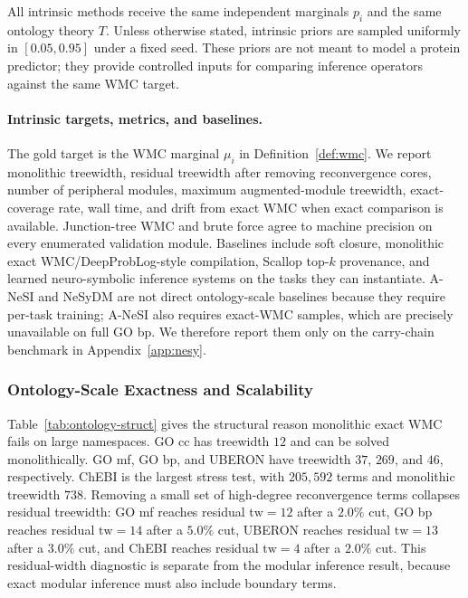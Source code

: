 \documentclass[letterpaper]{article}
\newcommand{\tw}{\ensuremath{\mathrm{tw}}}
\begin{document}
All intrinsic methods receive the same independent marginals $p_i$ and the same ontology theory $T$. Unless otherwise stated, intrinsic priors are sampled uniformly in $[0.05,0.95]$ under a fixed seed. These priors are not meant to model a protein predictor; they provide controlled inputs for comparing inference operators against the same WMC target.

\paragraph{Intrinsic targets, metrics, and baselines.}
The gold target is the WMC marginal $\mu_i$ in Definition~\ref{def:wmc}. We report monolithic treewidth, residual treewidth after removing reconvergence cores, number of peripheral modules, maximum augmented-module treewidth, exact-coverage rate, wall time, and drift from exact WMC when exact comparison is available. Junction-tree WMC and brute force agree to machine precision on every enumerated validation module. Baselines include soft closure, monolithic exact WMC/DeepProbLog-style compilation, Scallop top-$k$ provenance, and learned neuro-symbolic inference systems on the tasks they can instantiate. A-NeSI and NeSyDM are not direct ontology-scale baselines because they require per-task training; A-NeSI also requires exact-WMC samples, which are precisely unavailable on full GO bp. We therefore report them only on the carry-chain benchmark in Appendix~\ref{app:nesy}.

\subsubsection{Ontology-Scale Exactness and Scalability}\label{sec:main-results}
Table~\ref{tab:ontology-struct} gives the structural reason monolithic exact WMC fails on large namespaces. GO cc has treewidth $12$ and can be solved monolithically. GO mf, GO bp, and UBERON have treewidth $37$, $269$, and $46$, respectively. ChEBI is the largest stress test, with $205{,}592$ terms and monolithic treewidth $738$. Removing a small set of high-degree reconvergence terms collapses residual treewidth: GO mf reaches residual $\tw=12$ after a $2.0\%$ cut, GO bp reaches residual $\tw=14$ after a $5.0\%$ cut, UBERON reaches residual $\tw=13$ after a $3.0\%$ cut, and ChEBI reaches residual $\tw=4$ after a $2.0\%$ cut. This residual-width diagnostic is separate from the modular inference result, because exact modular inference must also include boundary terms.
\end{document}
